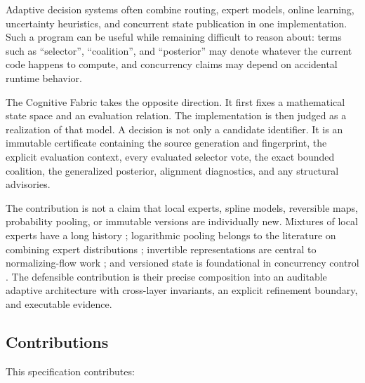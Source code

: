 \documentclass[11pt]{article}
\theoremstyle{definition}
\theoremstyle{plain}
\begin{document}
Adaptive decision systems often combine routing, expert models, online
learning, uncertainty heuristics, and concurrent state publication in one
implementation.  Such a program can be useful while remaining difficult to
reason about: terms such as ``selector'', ``coalition'', and ``posterior'' may
denote whatever the current code happens to compute, and concurrency claims
may depend on accidental runtime behavior.

The Cognitive Fabric takes the opposite direction.  It first fixes a
mathematical state space and an evaluation relation.  The implementation is
then judged as a realization of that model.  A decision is not only a candidate
identifier.  It is an immutable certificate containing the source generation
and fingerprint, the explicit evaluation context, every evaluated selector
vote, the exact bounded coalition, the generalized posterior, alignment
diagnostics, and any structural advisories.

The contribution is not a claim that local experts, spline models, reversible
maps, probability pooling, or immutable versions are individually new.
Mixtures of local experts have a long history
\cite{jacobs1991,jordan1994,shazeer2017}; logarithmic pooling belongs to the
literature on combining expert distributions \cite{genest1986,hinton2002};
invertible representations are central to normalizing-flow work
\cite{dinh2016}; and versioned state is foundational in concurrency control
\cite{reed1978,lamport1994}.  The defensible contribution is their precise
composition into an auditable adaptive architecture with cross-layer
invariants, an explicit refinement boundary, and executable evidence.

\subsection{Contributions}

This specification contributes:
\end{document}

